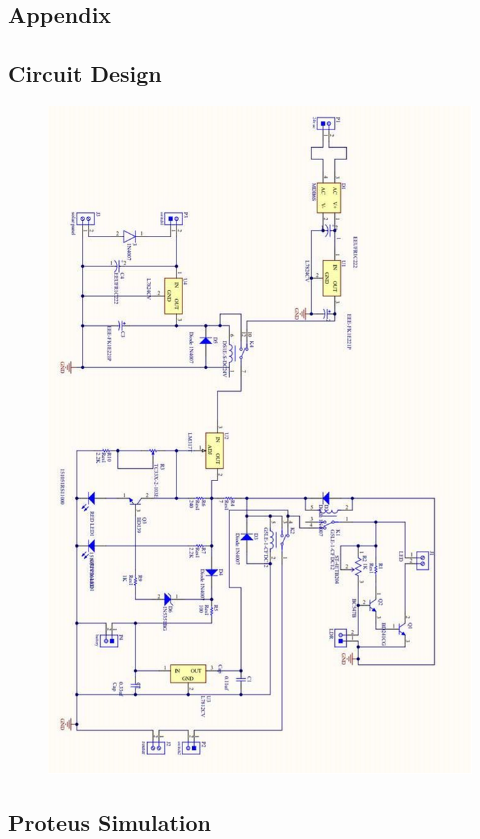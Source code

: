 \documentclass[twocolumn]{article}
\begin{document}
\begin{titlepage}
    \section*{Appendix}

    \subsection*{Circuit Design}
    
        \begin{figure}[h]
            \centering
            \includegraphics[width = 11.9cm]{15.png}
            \label{fig:enter-label}
        \end{figure}

    \newpage
    
    \subsection*{Proteus Simulation}


\end{titlepage}
\end{document}
